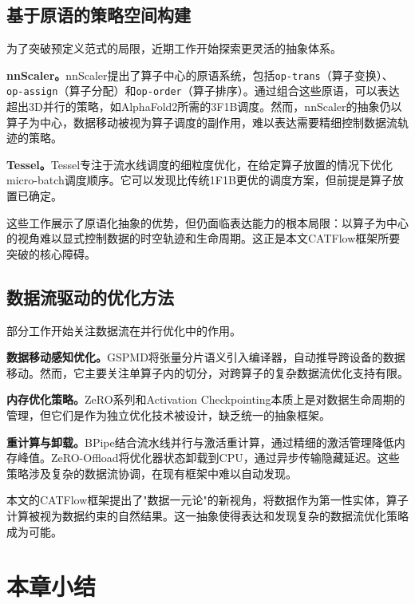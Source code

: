 \subsection{基于原语的策略空间构建}

为了突破预定义范式的局限，近期工作开始探索更灵活的抽象体系。

\textbf{nnScaler。}nnScaler\cite{lin2024nnscaler}提出了算子中心的原语系统，包括\texttt{op-trans}（算子变换）、\texttt{op-assign}（算子分配）和\texttt{op-order}（算子排序）。通过组合这些原语，可以表达超出3D并行的策略，如AlphaFold2所需的3F1B调度。然而，nnScaler的抽象仍以算子为中心，数据移动被视为算子调度的副作用，难以表达需要精细控制数据流轨迹的策略。

\textbf{Tessel。}Tessel\cite{lin2024tessel}专注于流水线调度的细粒度优化，在给定算子放置的情况下优化micro-batch调度顺序。它可以发现比传统1F1B更优的调度方案，但前提是算子放置已确定。

这些工作展示了原语化抽象的优势，但仍面临表达能力的根本局限：以算子为中心的视角难以显式控制数据的时空轨迹和生命周期。这正是本文CATFlow框架所要突破的核心障碍。

\subsection{数据流驱动的优化方法}

部分工作开始关注数据流在并行优化中的作用。

\textbf{数据移动感知优化。}GSPMD\cite{xu2021gspmd}将张量分片语义引入编译器，自动推导跨设备的数据移动。然而，它主要关注单算子内的切分，对跨算子的复杂数据流优化支持有限。

\textbf{内存优化策略。}ZeRO系列\cite{rajbhandari2020zero}和Activation Checkpointing\cite{chen2016training}本质上是对数据生命周期的管理，但它们是作为独立优化技术被设计，缺乏统一的抽象框架。

\textbf{重计算与卸载。}BPipe\cite{kim2023bpipe}结合流水线并行与激活重计算，通过精细的激活管理降低内存峰值。ZeRO-Offload\cite{ren2021zero}将优化器状态卸载到CPU，通过异步传输隐藏延迟。这些策略涉及复杂的数据流协调，在现有框架中难以自动发现。

本文的CATFlow框架提出了"数据一元论"的新视角，将数据作为第一性实体，算子计算被视为数据约束的自然结果。这一抽象使得表达和发现复杂的数据流优化策略成为可能。

\section{本章小结}

